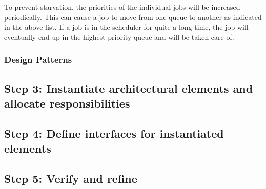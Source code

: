 \npar To prevent starvation, the priorities of the individual jobs will be
increased periodically. This can cause a job to move from one queue to another
as indicated in the above list. If a job is in the scheduler for quite a long
time, the job will eventually end up in the highest priority queue and will be
taken care of.

\subsubsection{Design Patterns}
\label{add:it3/patterns}

\npar 

\subsection{Step 3: Instantiate architectural elements and allocate responsibilities}
\label{add:it3/elements}

\subsection{Step 4: Define interfaces for instantiated elements}
\label{add:it3/interfaces}

\subsection{Step 5: Verify and refine}
\label{add:it3/verification}